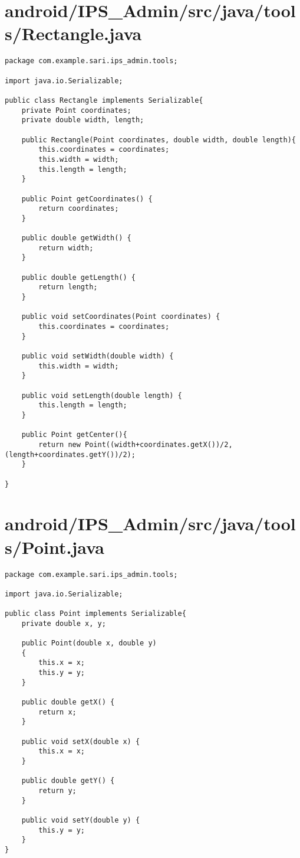 \section{android/IPS\_Admin/src/java/tools/Rectangle.java}
\begin{lstlisting}package com.example.sari.ips_admin.tools;

import java.io.Serializable;

public class Rectangle implements Serializable{
    private Point coordinates;
    private double width, length;

    public Rectangle(Point coordinates, double width, double length){
        this.coordinates = coordinates;
        this.width = width;
        this.length = length;
    }

    public Point getCoordinates() {
        return coordinates;
    }

    public double getWidth() {
        return width;
    }

    public double getLength() {
        return length;
    }

    public void setCoordinates(Point coordinates) {
        this.coordinates = coordinates;
    }

    public void setWidth(double width) {
        this.width = width;
    }

    public void setLength(double length) {
        this.length = length;
    }

    public Point getCenter(){
        return new Point((width+coordinates.getX())/2,(length+coordinates.getY())/2);
    }

}
\end{lstlisting}
\newpage
\section{android/IPS\_Admin/src/java/tools/Point.java}
\begin{lstlisting}package com.example.sari.ips_admin.tools;

import java.io.Serializable;

public class Point implements Serializable{
    private double x, y;

    public Point(double x, double y)
    {
        this.x = x;
        this.y = y;
    }

    public double getX() {
        return x;
    }

    public void setX(double x) {
        this.x = x;
    }

    public double getY() {
        return y;
    }

    public void setY(double y) {
        this.y = y;
    }
}
\end{lstlisting}
\newpage

